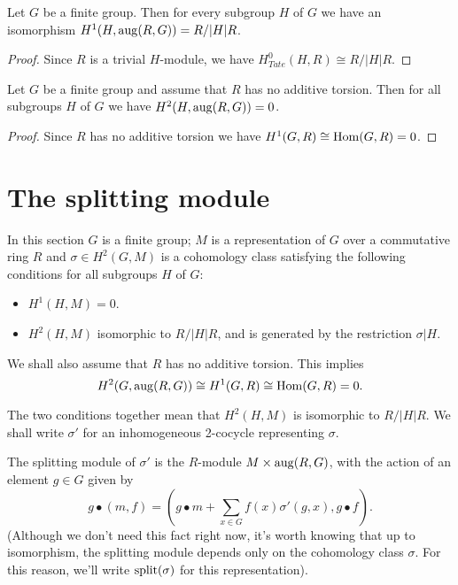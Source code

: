 \begin{lemma}
	Let $G$ be a finite group.
	Then for every subgroup $H$ of $G$ we have an isomorphism $H^1(H,\mathrm{aug}(R,G)) = R / |H| R$.
\end{lemma}

\begin{proof}
	Since $R$ is a trivial $H$-module, we have $H^0_{Tate}(H,R) \cong R / |H| R$.
\end{proof}


\begin{lemma}
	Let $G$ be a finite group and assume that $R$ has no additive torsion.
	Then for all subgroups $H$ of $G$ we have $H^2(H,\mathrm{aug}(R,G)) = 0$.
\end{lemma}

\begin{proof}
	Since $R$ has no additive torsion we have
	$H^1(G,R) \cong \mathrm{Hom}(G,R) = 0$.
\end{proof}


\section{The splitting module}

In this section $G$ is a finite group; $M$ is a representation of $G$ over a commutative ring $R$
 and $\sigma \in H^2(G,M)$ is a cohomology class satisfying the following conditions for all
 subgroups $H$ of $G$:
\begin{itemize}
	\item
	$H^1(H,M)=0$.
	\item
	$H^2(H,M)$ isomorphic to $R / |H|R$, and is generated by the restriction $\sigma | H$.
\end{itemize}
We shall also assume that $R$ has no additive torsion. This implies
\[
	H^2(G,\mathrm{aug}(R,G)) \cong H^1(G,R) \cong \mathrm{Hom}(G,R) = 0.
\]


The two conditions together mean that $H^2(H,M)$ is isomorphic to $R/|H|R$.
We shall write $\sigma'$ for an inhomogeneous 2-cocycle representing $\sigma$.

\begin{definition}
	The splitting module of $\sigma'$ is the $R$-module $M \times \mathrm{aug}(R,G)$,
	with the action of an element $g \in G$ given by
	\[
		g \bullet (m,f)
		= \left(g \bullet m + \sum_{x \in G} f(x) \sigma'(g,x) , g \bullet f\right).
	\]
	(Although we don't need this fact right now, it's worth knowing that up to isomorphism, the splitting module depends only on the cohomology class $\sigma$. For this reason, we'll write
	$\mathrm{split}(\sigma)$ for this representation).
\end{definition}



